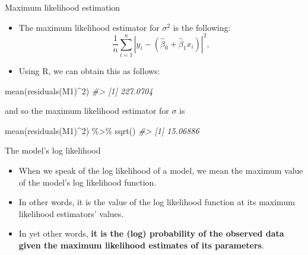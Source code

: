 \documentclass[
  10pt,
  ignorenonframetext,
]{beamer}
\newenvironment{Shaded}{\begin{snugshade}}{\end{snugshade}}
\newcommand{\CommentTok}[1]{\textcolor[rgb]{0.56,0.35,0.01}{\textit{#1}}}
\newcommand{\DecValTok}[1]{\textcolor[rgb]{0.00,0.00,0.81}{#1}}
\newcommand{\FunctionTok}[1]{\textcolor[rgb]{0.00,0.00,0.00}{#1}}
\newcommand{\NormalTok}[1]{#1}
\newcommand{\SpecialCharTok}[1]{\textcolor[rgb]{0.00,0.00,0.00}{#1}}
\providecommand{\tightlist}{%
  \setlength{\itemsep}{0pt}\setlength{\parskip}{0pt}}
\begin{document}
\begin{frame}[fragile]{Maximum likelihood estimation}
\protect\hypertarget{maximum-likelihood-estimation-2}{}
\begin{itemize}
\tightlist
\item
  The maximum likelihood estimator for \(\sigma^2\) is the following: \[
  \frac{1}{n}\sum_{i=1}^n |y_i - (\hat{\beta}_0 + \hat{\beta}_1 x_i)|^2,
  \]
\item
  Using R, we can obtain this as follows:
\end{itemize}

\begin{Shaded}
\begin{Highlighting}[]
\FunctionTok{mean}\NormalTok{(}\FunctionTok{residuals}\NormalTok{(M1)}\SpecialCharTok{\^{}}\DecValTok{2}\NormalTok{)}
\CommentTok{\#\textgreater{} [1] 227.0704}
\end{Highlighting}
\end{Shaded}

and so the maximum likelihood estimator for \(\sigma\) is

\begin{Shaded}
\begin{Highlighting}[]
\FunctionTok{mean}\NormalTok{(}\FunctionTok{residuals}\NormalTok{(M1)}\SpecialCharTok{\^{}}\DecValTok{2}\NormalTok{) }\SpecialCharTok{\%\textgreater{}\%} \FunctionTok{sqrt}\NormalTok{()}
\CommentTok{\#\textgreater{} [1] 15.06886}
\end{Highlighting}
\end{Shaded}
\end{frame}

\begin{frame}{The model's log likelihood}
\protect\hypertarget{the-models-log-likelihood}{}
\begin{itemize}
\tightlist
\item
  When we speak of the log likelihood of a model, we mean the maximum
  value of the model's log likelihood function.
\item
  In other words, it is the value of the log likelihood function at its
  maximum likelihood estimators' values.
\item
  In yet other words, \textbf{it is the (log) probability of the
  observed data given the maximum likelihood estimates of its
  parameters}.
\end{itemize}
\end{frame}
\end{document}
